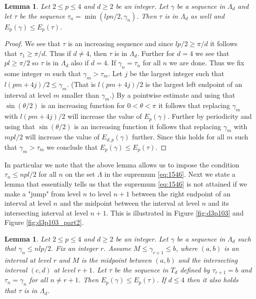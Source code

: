 \documentclass{amsart}
\theoremstyle{plain}
\newtheorem{lemma}[theorem]{Lemma}
\theoremstyle{remark}
\begin{document}
	\begin{lemma}\label{lem:tleq}
		Let $2 \leq p \leq 4$ and $d\geq 2$ be an integer. Let $\gamma$ be a sequence in $\Lambda_d$ and let $\tau$ be the sequence $\tau_n=\min(lpn/2, \gamma_n)$. Then $\tau$ is in $\Lambda_d$ as well and $E_p(\gamma) \leq E_p(\tau)$.  
	\end{lemma}
	
	\begin{proof}
		We see that $\tau$ is an increasing sequence and since $lp/2 \geq \pi/d$ it follows that $\tau_1 \geq \pi/d$. Thus if $d \neq 4$, then $\tau$ is in $\Lambda_d$. Further for $d=4$ we see that $pl \geq \pi/2$ so $\tau$ is in $\Lambda_d$ also if $d=4$. If $\gamma_n=\tau_n$ for all $n$ we are done. Thus we fix some integer $m$ such that $\gamma_m > \tau_m$. Let $j$ be the largest integer such that $l(pm+4j)/2 \leq \gamma_m$. (That is $l(pm+4j)/2$ is the largest left endpoint of an interval at level $m$ smaller than $\gamma_m$.) By a pointwise estimate and using that $\sin(\theta/2)$ is an increasing function for $0<\theta < \pi$ it follows that replacing $\gamma_m$ with $l(pm+4j)/2$ will increase the value of $E_p(\gamma)$. Further by periodicity and using that $\sin(\theta/2)$ is an increasing function it follows that replacing $\gamma_m$ with $mpl/2$ will increase the value of $E_{d,p}(\gamma)$ further. Since this holds for all $m$ such that $\gamma_m > \tau_m$ we conclude that $E_p(\gamma) \leq E_p(\tau)$. 
	\end{proof}
	
	In particular we note that the above lemma allows us to impose the condition $\tau_n \leq npl/2$ for all $n$ on the set $\Lambda$ in the supremum \eqref{eq:1546}. Next we state a lemma that essentially tells us that the supremum \eqref{eq:1546} is not attained if we make a "jump" from level $n$ to level $n+1$ between the right endpoint of an interval at level $n$ and the midpoint between the interval at level $n$ and its intersecting interval at level $n+1$. This is illustrated in Figure \ref{fig:d3p103} and Figure \ref{fig:d3p103_part2}. 
	
	\begin{lemma}\label{lem:mid}
		Let $2 \leq p \leq 4$ and $d\geq 2$ be an integer. Let $\gamma$ be a sequence in $\Lambda_d$ such that $\gamma_n \leq nlp/2$. Fix an integer $r$. Assume $M \leq \gamma_{r+1} \leq b$, where $(a,b)$ is an interval at level $r$ and $M$ is the midpoint between $(a,b)$ and the intersecting interval $(c,d)$ at level $r+1$. Let $\tau$ be the sequence in $T_d$ defined by $\tau_{r+1}=b$ and $\tau_n=\gamma_n$ for all $n \neq r+1$. Then $E_p(\gamma) \leq E_p(\tau)$. If $d \leq 4$ then it also holds that $\tau$ is in $\Lambda_d$. 
	\end{lemma}
	
\end{document}
